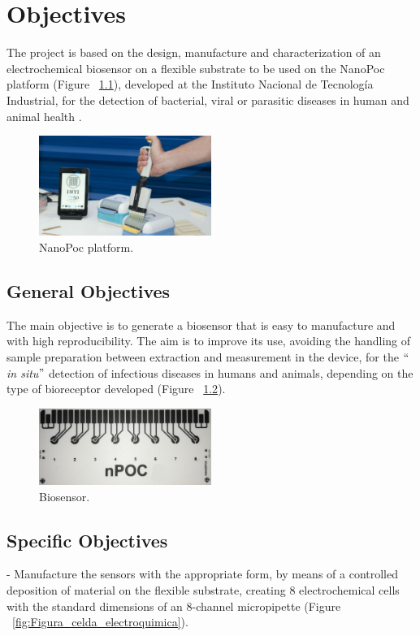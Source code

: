 \chapter{Objectives}
The project is based on the design, manufacture and characterization of an electrochemical biosensor on a flexible substrate to be used on the NanoPoc platform (Figure ~\ref{fig:Figura_Nano_Poc}), developed at the Instituto Nacional de Tecnología Industrial, for the detection of bacterial, viral or parasitic diseases in human and animal health \cite{PosterPoc2}.

\begin{figure}[H]
  \centering
    \includegraphics[width=0.5\textwidth]{Figures/Figura_Nano_Poc}
  \caption{NanoPoc platform.}
  \label{fig:Figura_Nano_Poc}
\end{figure}

\section{General Objectives}
The main objective is to generate a biosensor that is easy to manufacture and with high reproducibility. The aim is to improve its use, avoiding the handling of sample preparation between extraction and measurement in the device, for the $``$\textit{in situ}$"$ detection of infectious diseases in humans and animals, depending on the type of bioreceptor developed (Figure ~\ref{fig:Figura_Biosensor_objetivos}).

\begin{figure}[H]
  \centering
    \includegraphics[width=0.5\textwidth]{Figures/Figura_Biosensor_objetivos}
  \caption{Biosensor.}
  \label{fig:Figura_Biosensor_objetivos}
\end{figure}

\section{Specific Objectives}
- Manufacture the sensors with the appropriate form, by means of a controlled deposition of material on the flexible substrate, creating 8 electrochemical cells with the standard dimensions of an 8-channel micropipette (Figure ~\ref{fig:Figura_celda_electroquimica}).\\

